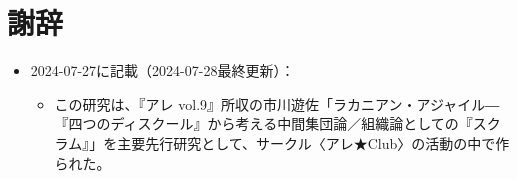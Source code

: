 \section{謝辞}\label{ux8b1dux8f9e}

\begin{itemize}
\tightlist
\item
  2024-07-27に記載（2024-07-28最終更新）：

  \begin{itemize}
  \tightlist
  \item
    この研究は、『アレ
    vol.9』所収の市川遊佐「ラカニアン・アジャイル―『四つのディスクール』から考える中間集団論／組織論としての『スクラム』」を主要先行研究として、サークル〈アレ★Club〉の活動の中で作られた。
  \end{itemize}
\end{itemize}
